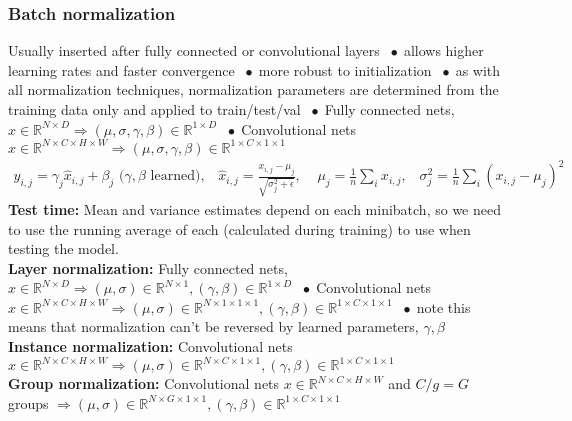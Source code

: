 \documentclass[9pt]{extarticle}
\newcommand*\bspace{$\; \bullet \;$}
\begin{document}
\subsubsection{Batch normalization}
Usually inserted after fully connected or convolutional layers \bspace allows higher learning rates and faster convergence \bspace more robust to initialization \bspace as with all normalization techniques, normalization parameters are determined from the training data only and applied to train/test/val  \bspace Fully connected nets, $x \in \mathbb{R}^{N\times D} \Longrightarrow (\mu, \sigma, \gamma, \beta) \in \mathbb{R}^{1\times D}$ \bspace Convolutional nets $x \in \mathbb{R}^{N\times C\times H\times W} \Longrightarrow (\mu, \sigma, \gamma, \beta) \in \mathbb{R}^{1\times C\times 1\times 1}$
\begin{align*}
    y_{i,j} = \gamma_j\hat{x}_{i,j} + \beta_j \textrm{ ($\gamma,\beta$ learned)}, \;\;\; \hat{x}_{i,j} = \frac{x_{i,j} - \mu_j}{\sqrt{\sigma_j^2 + \epsilon}}, \;\;\;\; \mu_j = \frac{1}{n}\sum_i x_{i,j}, \;\;\; \sigma_j^2 = \frac{1}{n}\sum_i(x_{i,j} - \mu_j)^2
\end{align*}
\textbf{Test time:} Mean and variance estimates depend on each minibatch, so we need to use the running average of each (calculated during training) to use when testing the model.\\
\textbf{Layer normalization:} Fully connected nets, $x \in \mathbb{R}^{N\times D} \Longrightarrow (\mu, \sigma) \in \mathbb{R}^{N\times 1}, (\gamma, \beta) \in \mathbb{R}^{1\times D}$ \bspace Convolutional nets $x \in \mathbb{R}^{N\times C\times H\times W} \Longrightarrow (\mu, \sigma) \in \mathbb{R}^{N\times 1\times 1\times 1}, (\gamma, \beta) \in \mathbb{R}^{1\times C\times 1\times 1}$ \bspace note this means that normalization can't be reversed by learned parameters, $\gamma, \beta$ \\
\textbf{Instance normalization:} Convolutional nets $x \in \mathbb{R}^{N\times C\times H\times W} \Longrightarrow (\mu, \sigma) \in \mathbb{R}^{N\times C\times 1\times 1}, (\gamma, \beta) \in \mathbb{R}^{1\times C\times 1\times 1}$\\
\textbf{Group normalization:} Convolutional nets $x \in \mathbb{R}^{N\times C\times H\times W}$ and $C / g = G$ groups $\Longrightarrow (\mu, \sigma) \in \mathbb{R}^{N\times G\times 1\times 1}, (\gamma, \beta) \in \mathbb{R}^{1\times C\times 1\times 1}$
\end{document}
